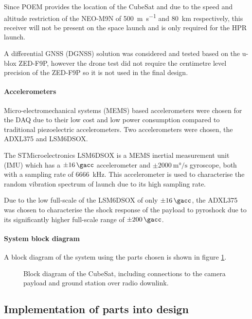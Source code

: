 \documentclass[a4paper,11pt]{article}
\begin{document}
Since POEM provides the location of the CubeSat and due to the speed and altitude restriction of the NEO-M9N of \SI{500}{\metre\per\second} and \SI{80}{\kilo\metre} respectively, this receiver will not be present on the space launch and is only required for the HPR launch.

A differential GNSS (DGNSS) solution was considered and tested based on the u-blox ZED-F9P, however the drone test did not require the centimetre level precision of the ZED-F9P so it is not used in the final design.

\paragraph{Accelerometers}

Micro-electromechanical systems (MEMS) based accelerometers were chosen for the DAQ due to their low cost and low power consumption compared to traditional piezoelectric accelerometers. %
Two accelerometers were chosen, the ADXL375 and LSM6DSOX.

The STMicroelectronics LSM6DSOX is a MEMS inertial measurement unit (IMU) which has a $\pm\SI{16}{\gacc}$ accelerometer and $\pm\SI{2000}{\milli\degree\per\second}$ gyroscope, both with a sampling rate of \SI{6666}{\kilo\hertz}. This accelerometer is used to characterise the random vibration spectrum of launch due to its high sampling rate.

Due to the low full-scale of the LSM6DSOX of only $\pm\SI{16}{\gacc}$, the ADXL375 was chosen to characterise the shock response of the payload to pyroshock due to its significantly higher full-scale range of $\pm\SI{200}{\gacc}$.

\paragraph{System block diagram}

A block diagram of the system using the parts chosen is shown in figure \ref{fig:system-block-diagram}.

\begin{figure}[H]
  \centering
  
  \label{fig:system-block-diagram}
  \caption{Block diagram of the CubeSat, including connections to the camera payload and ground station over radio downlink.}
\end{figure}

\subsection{Implementation of parts into design}
\end{document}

